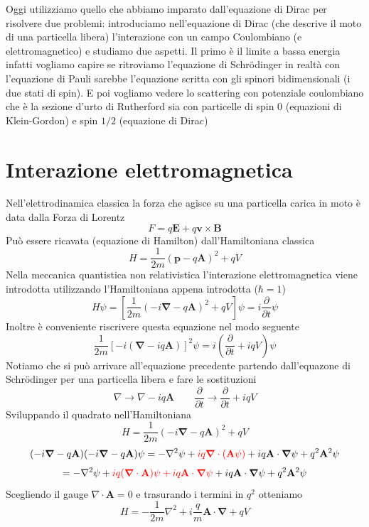 Oggi utilizziamo quello che abbiamo imparato dall'equazione di Dirac per risolvere due problemi: introduciamo nell'equazione di Dirac (che descrive il moto di una particella libera) l'interazione con un campo Coulombiano (e elettromagnetico) e studiamo due aspetti. Il primo è il limite a bassa energia infatti vogliamo capire se ritroviamo l'equazione di Schr\"odinger  in realtà con l'equazione di Pauli sarebbe l'equazione scritta con gli spinori bidimensionali (i due stati di spin). E poi vogliamo vedere lo scattering con potenziale coulombiano che è la sezione d'urto di Rutherford sia con particelle di spin 0 (equazioni di Klein-Gordon) e spin $1/2$ (equazione di Dirac)
\section{Interazione elettromagnetica}
Nell'elettrodinamica classica la forza che agisce su una particella carica in moto è data dalla Forza di Lorentz
$$
F = q\mathbf{E} + q\mathbf{v} \times \mathbf{B}
$$
Può essere ricavata (equazione di Hamilton) dall'Hamiltoniana classica
$$
H = \frac{1}{2m}(\mathbf{p} - q\mathbf{A})^2 + qV
$$
Nella meccanica quantistica non relativistica l'interazione elettromagnetica viene introdotta utilizzando l'Hamiltoniana appena introdotta ($\hbar=1$)
$$
H\psi = \left[ \frac{1}{2m}(-i\boldsymbol{\nabla} - q\mathbf{A})^2 + qV \right] \psi = i\frac{\partial}{\partial t}\psi
$$
Inoltre è conveniente riscrivere questa equazione nel modo seguente
$$
\frac{1}{2m} \left[ -i(\boldsymbol{\nabla} - iq\mathbf{A}) \right]^2 \psi = i \left( \frac{\partial}{\partial t} + iqV \right) \psi
$$
Notiamo che si può arrivare all'equazione precedente partendo dall'equazone di Schr\"odinger per una particella libera e fare le sostituzioni
$$
\nabla \to \nabla - iq\mathbf{A} \qquad \frac{\partial}{\partial t} \to \frac{\partial}{\partial t} + iqV
$$
Sviluppando il quadrato nell'Hamiltoniana
$$
H = \frac{1}{2m}(-i\boldsymbol{\nabla} - q\mathbf{A})^2 + qV
$$
$$
(-i\boldsymbol{\nabla} - q\mathbf{A})(-i\boldsymbol{\nabla} - q\mathbf{A})\psi = -\nabla^2\psi + \textcolor{red}{iq\boldsymbol{\nabla} \cdot ({\mathbf{A}\psi})} + iq\mathbf{A} \cdot \boldsymbol{\nabla}\psi + q^2\mathbf{A}^2\psi
$$
$$
= -\nabla^2\psi + \textcolor{red}{iq(\boldsymbol{\nabla} \cdot \mathbf{A})\psi + iq\mathbf{A} \cdot \boldsymbol{\nabla}\psi} + iq\mathbf{A} \cdot \boldsymbol{\nabla}\psi + q^2\mathbf{A}^2\psi
$$
Scegliendo il gauge $\nabla\cdot \mathbf{A}=0$ e trasurando i termini in $q^2$ otteniamo
$$
H = -\frac{1}{2m}\nabla^2 + i\frac{q}{m}\mathbf{A} \cdot \boldsymbol{\nabla} + qV
$$
